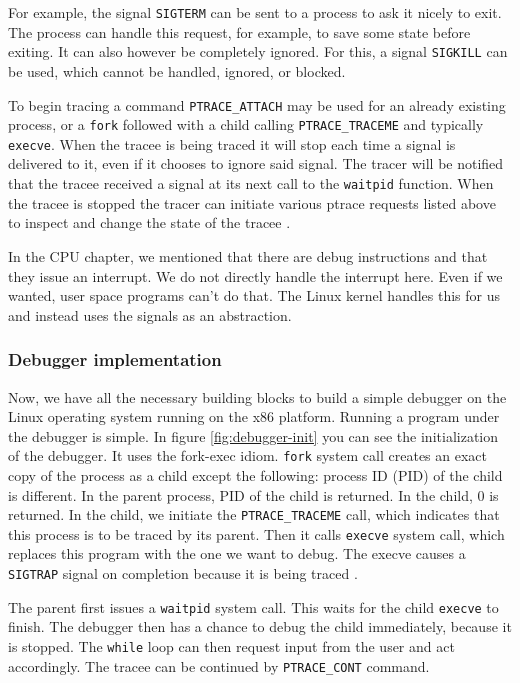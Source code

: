 For example, the signal \texttt{SIGTERM} can be sent to a process to ask it
nicely to exit. The process can handle this request, for example, to save some
state before exiting. It can also however be completely ignored. For this, a
signal \texttt{SIGKILL} can be used, which cannot be handled, ignored, or
blocked.

To begin tracing a command \texttt{PTRACE\_ATTACH} may be used for an already
existing process, or a \texttt{fork} followed with a child calling
\texttt{PTRACE\_TRACEME} and typically \texttt{execve}. When the tracee is
being traced it will stop each time a signal is delivered to it, even if it
chooses to ignore said signal. The tracer will be notified that the tracee
received a signal at its next call to the \texttt{waitpid} function. When the
tracee is stopped the tracer can initiate various ptrace requests listed above
to inspect and change the state of the tracee \cite{ptrace}.

In the CPU chapter, we mentioned that there are debug instructions and that
they issue an interrupt. We do not directly handle the interrupt here. Even if
we wanted, user space programs can't do that. The Linux kernel handles this for
us and instead uses the signals as an abstraction. 

\subsubsection{Debugger implementation}
Now, we have all the necessary building blocks to build a simple debugger on
the Linux operating system running on the x86 platform. Running a program under
the debugger is simple. In figure \ref{fig:debugger-init} you can see the
initialization of the debugger. It uses the fork-exec idiom. \texttt{fork}
system call creates an exact copy of the process as a child except the
following: process ID (PID) of the child is different. In the parent process,
PID of the child is returned. In the child, $0$ is returned. In the child, we
initiate the \texttt{PTRACE\_TRACEME} call, which indicates that this process
is to be traced by its parent. Then it calls \texttt{execve} system call, which
replaces this program with the one we want to debug. The execve causes a
\texttt{SIGTRAP} signal on completion because it is being traced
\cite{execve}.

The parent first issues a \texttt{waitpid} system call. This waits for the
child \texttt{execve} to finish. The debugger then has a chance to debug the
child immediately, because it is stopped. The \texttt{while} loop can then
request input from the user and act accordingly. The tracee can be continued by
\texttt{PTRACE\_CONT} command.


